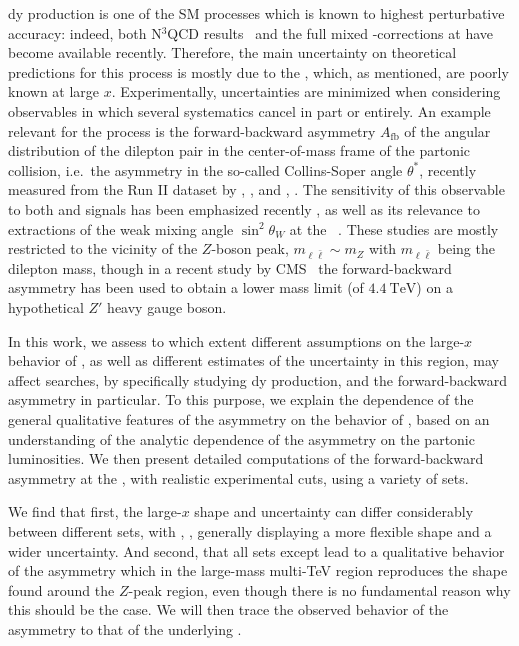 \acrlong{dy} production is one of the SM processes which is known to highest
perturbative accuracy: indeed, both N$^3$\lo QCD results~\cite{Duhr:2021vwj} and
the full mixed \qcd-\ew corrections at \nnlo
\cite{Buccioni:2020cfi,Buccioni:2022kgy,Bonciani:2020tvf,Bonciani:2021zzf,Armadillo:2022bgm}
have become available recently.
%
Therefore, the main uncertainty on theoretical predictions for this process is
mostly due to the \pdfs, which, as mentioned, are poorly known at large $x$.
%
Experimentally, uncertainties are minimized when considering observables in
which several systematics cancel in part or entirely.
%
An example relevant for the \dy process is the forward-backward asymmetry
$A_{\text{fb}}$ of the angular distribution of the dilepton pair in the
center-of-mass frame of the partonic collision, i.e.\ the asymmetry in the
so-called Collins-Soper angle $\theta^*$, recently measured from the Run II
dataset by \atlas, \cite{ATLAS:2017rue}, and \cms, \cite{CMS:2022uul}.
%
The sensitivity of this observable to both \pdfs and \bsm signals has
been emphasized recently
\cite{Fiaschi:2021sin,Fiaschi:2021okg,Accomando:2019vqt,Accomando:2018nig}, as
well as its relevance to extractions of the weak mixing angle $\sin^2\theta_W$
at the \lhc~\cite{CMS:2018ktx}.
These studies  are mostly restricted to the vicinity of the $Z$-boson peak,
$m_{\ell\bar{\ell}} \sim m_Z$ with $m_{\ell\bar{\ell}}$ being the dilepton
mass, though in a recent study by CMS~\cite{CMS:2022uul} the forward-backward
asymmetry has been used to obtain a lower mass limit (of
$\SI{4.4}{\tera\electronvolt}$) on a hypothetical $Z'$ heavy gauge boson.

In this work, we assess to which extent different assumptions on the large-$x$
behavior of \pdfs, as well as different estimates of the \pdf uncertainty in
this region, may affect \bsm searches, by specifically studying \nc
\acrlong{dy} production, and the forward-backward asymmetry in particular.
To this purpose, we explain the dependence of the general qualitative features
of the asymmetry on the behavior of \pdfs, based on an understanding  of the
analytic dependence of the asymmetry on the partonic luminosities.
%
We then present detailed computations of the forward-backward asymmetry at the
\lhc, with realistic experimental cuts, using a variety of \pdf sets.

We find that first, the large-$x$ \pdf shape and uncertainty can differ
considerably between different \pdf sets, with ,
\cite{Ball:2021leu}, generally displaying a more flexible shape and a wider
uncertainty.
%
And second, that all \pdf sets except  lead to a qualitative
behavior of the asymmetry which in the large-mass multi-TeV region reproduces
the shape found around the $Z$-peak region, even though there is no fundamental
reason why this should be the case.
%
We will then trace the observed behavior of the asymmetry to that of the
underlying \pdfs.
